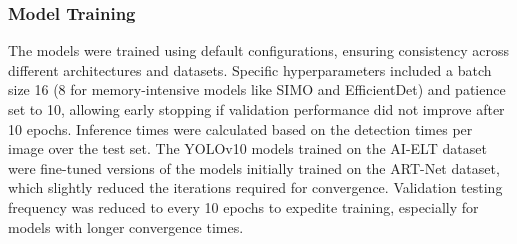



\subsubsection{Model Training}

The models were trained using default configurations, ensuring consistency across different architectures and datasets. Specific hyperparameters included a batch size 16 (8 for memory-intensive models like SIMO and EfficientDet) and patience set to 10, allowing early stopping if validation performance did not improve after 10 epochs. Inference times were calculated based on the detection times per image over the test set. The YOLOv10 models trained on the AI-ELT dataset were fine-tuned versions of the models initially trained on the ART-Net dataset, which slightly reduced the iterations required for convergence. Validation testing frequency was reduced to every 10 epochs to expedite training, especially for models with longer convergence times.

